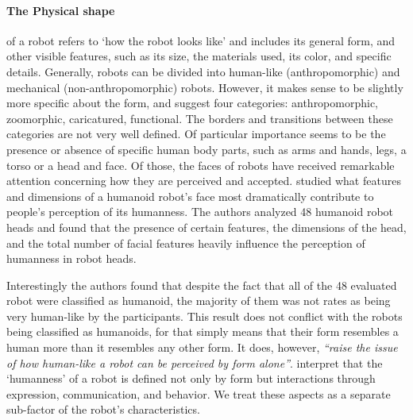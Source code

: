 \documentclass{frontiersSCNS} %
\begin{document}
\paragraph{The Physical shape} of a robot refers to `how the robot looks like' and includes its general form, and other visible features, such as its size, the materials used, its color, and specific details. Generally, robots can be divided into human-like (anthropomorphic) and mechanical (non-anthropomorphic) robots. However, it makes sense to be slightly more specific about the form, and \cite{fong_survey_2003} suggest four categories: anthropomorphic, zoomorphic, caricatured, functional. The borders and transitions between these categories are not very well defined. 
Of particular importance seems to be the presence or absence of specific human body parts, such as arms and hands, legs, a torso or a head and face. Of those, the faces of robots have received remarkable attention concerning how they are perceived and accepted. \cite{disalvo_all_2002} studied what features and dimensions of a humanoid robot's face most dramatically contribute to people's perception of its humanness. The authors analyzed 48 humanoid robot heads and found that the presence of certain features, the dimensions of the head, and the total number of facial features heavily influence the perception of humanness in robot heads. 

Interestingly the authors found that despite the fact that all of the 48 evaluated robot were classified as humanoid, the majority of them was not rates as being very human-like by the participants. This result does not conflict with the robots being classified as humanoids, for that simply means that their form resembles a human more than it resembles any other form. It does, however, \textit{``raise the issue of how human-like a robot can be perceived by form alone''}. \citep{disalvo_all_2002} interpret that the `humanness' of a robot is defined not only by form but interactions through expression, communication, and behavior. We treat these aspects as a separate sub-factor of the robot's characteristics.
\end{document}
